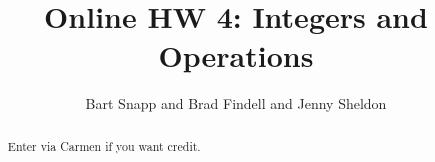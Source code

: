\documentclass[handout,space,nooutcomes]{xourse}
\title{Online HW 4: Integers and Operations}
\author{Bart Snapp and Brad Findell and Jenny Sheldon}
\begin{document}
\begin{abstract}
Enter via Carmen if you want credit.   
\end{abstract}
\maketitle

{}
\end{document}
